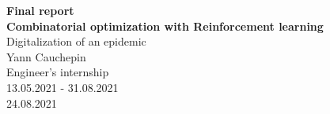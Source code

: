 \begin{titlepage}
\begin{figure}[t]
		\end{figure}

		\centering \huge
		\vspace*{1cm}
		\textbf{Final report \\
			\vspace{1cm}
			Combinatorial optimization with Reinforcement learning\\}
		\LARGE
		\vspace{1cm}
		Digitalization of an epidemic\\
		\vspace{2cm}
		Yann Cauchepin\\
		\vspace{1cm}
		Engineer's internship\\
		\vspace{1cm}
		13.05.2021 - 31.08.2021\\
		\vspace{3cm}
		\large 24.08.2021
		
	\end{titlepage}